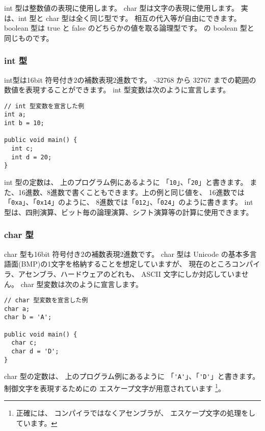 int 型は整数値の表現に使用します。
char 型は文字の表現に使用します。
実は、int 型と char 型は全く同じ型です。
相互の代入等が自由にできます。
boolean 型は true と false のどちらかの値を取る論理型です。
\javal の boolean 型と同じものです。

\subsubsection{int 型}
int型は16bit 符号付き2の補数表現2進数です。
-32768 から 32767 までの範囲の数値を表現することができます。
int 型変数は次のように宣言します。

\begin{mylist}
\begin{verbatim}
// int 型変数を宣言した例
int a;
int b = 10;

public void main() {
  int c;
  int d = 20;
}
\end{verbatim}
\end{mylist}

int 型の定数は、
上のプログラム例にあるように 「\verb/10/」、「\verb/20/」と書きます。
また、16進数、8進数で書くこともできます。上の例と同じ値を、
16進数では「\verb/0xa/」、「\verb/0x14/」のように、
8進数では「\verb/012/」、「\verb/024/」のように書きます。
int 型は、四則演算、ビット毎の論理演算、シフト演算等の計算に使用できます。

\subsubsection{char 型}
char 型も16bit 符号付き2の補数表現2進数です。
char 型は Unicode の基本多言語面(BMP)の1文字を格納することを想定していますが、
現在のところコンパイラ、アセンブラ、\tac ハードウェアのどれも、
ASCII 文字にしか対応していません。
char 型変数は次のように宣言します。

\begin{mylist}
\begin{verbatim}
// char 型変数を宣言した例
char a;
char b = 'A';

public void main() {
  char c;
  char d = 'D';
}
\end{verbatim}
\end{mylist}

char 型の定数は、
上のプログラム例にあるように 「\verb/'A'/」、「\verb/'D'/」と書きます。
制御文字を表現するためにの
エスケープ文字が用意されています
\footnote{正確には、
コンパイラではなくアセンブラが、
エスケープ文字の処理をしています。}。


